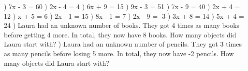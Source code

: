 \documentclass{article}%
\begin{document}
) 7x - 3 = 60%
\newline%
\newline%
) 2x - 4 = 4%
\newline%
\newline%
) 6x + 9 = 15%
\newline%
\newline%
) 9x - 3 = 51%
\newline%
\newline%
) 7x - 9 = 40%
\newline%
\newline%
) 2x + 4 = 12%
\newline%
\newline%
) x + 5 = 6%
\newline%
\newline%
) 2x - 1 = 15%
\newline%
\newline%
) 8x - 1 = 7%
\newline%
\newline%
) 2x - 9 = -3%
\newline%
\newline%
) 3x + 8 = 14%
\newline%
\newline%
) 5x + 4 = 24%
\newline%
\newline%
) Laura had an unknown number of books. They got 4 times as many books before getting 4 more. In total, they now have 8 books. How many objects did Laura start with?%
\newline%
\newline%
) Laura had an unknown number of pencils. They got 3 times as many pencils before losing 5 more. In total, they now have -2 pencils. How many objects did Laura start with?%
\newline%
\newline%
\end{document}
